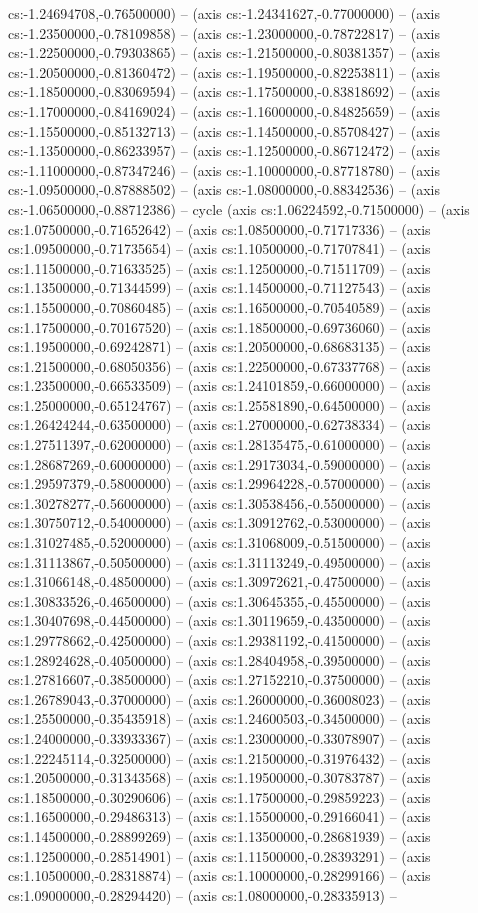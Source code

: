 cs:-1.24694708,-0.76500000) -- (axis cs:-1.24341627,-0.77000000) -- (axis cs:-1.23500000,-0.78109858) -- (axis cs:-1.23000000,-0.78722817) -- (axis cs:-1.22500000,-0.79303865) -- (axis cs:-1.21500000,-0.80381357) -- (axis cs:-1.20500000,-0.81360472) -- (axis cs:-1.19500000,-0.82253811) -- (axis cs:-1.18500000,-0.83069594) -- (axis cs:-1.17500000,-0.83818692) -- (axis cs:-1.17000000,-0.84169024) -- (axis cs:-1.16000000,-0.84825659) -- (axis cs:-1.15500000,-0.85132713) -- (axis cs:-1.14500000,-0.85708427) -- (axis cs:-1.13500000,-0.86233957) -- (axis cs:-1.12500000,-0.86712472) -- (axis cs:-1.11000000,-0.87347246) -- (axis cs:-1.10000000,-0.87718780) -- (axis cs:-1.09500000,-0.87888502) -- (axis cs:-1.08000000,-0.88342536) -- (axis cs:-1.06500000,-0.88712386) -- cycle (axis cs:1.06224592,-0.71500000) -- (axis cs:1.07500000,-0.71652642) -- (axis cs:1.08500000,-0.71717336) -- (axis cs:1.09500000,-0.71735654) -- (axis cs:1.10500000,-0.71707841) -- (axis cs:1.11500000,-0.71633525) -- (axis cs:1.12500000,-0.71511709) -- (axis cs:1.13500000,-0.71344599) -- (axis cs:1.14500000,-0.71127543) -- (axis cs:1.15500000,-0.70860485) -- (axis cs:1.16500000,-0.70540589) -- (axis cs:1.17500000,-0.70167520) -- (axis cs:1.18500000,-0.69736060) -- (axis cs:1.19500000,-0.69242871) -- (axis cs:1.20500000,-0.68683135) -- (axis cs:1.21500000,-0.68050356) -- (axis cs:1.22500000,-0.67337768) -- (axis cs:1.23500000,-0.66533509) -- (axis cs:1.24101859,-0.66000000) -- (axis cs:1.25000000,-0.65124767) -- (axis cs:1.25581890,-0.64500000) -- (axis cs:1.26424244,-0.63500000) -- (axis cs:1.27000000,-0.62738334) -- (axis cs:1.27511397,-0.62000000) -- (axis cs:1.28135475,-0.61000000) -- (axis cs:1.28687269,-0.60000000) -- (axis cs:1.29173034,-0.59000000) -- (axis cs:1.29597379,-0.58000000) -- (axis cs:1.29964228,-0.57000000) -- (axis cs:1.30278277,-0.56000000) -- (axis cs:1.30538456,-0.55000000) -- (axis cs:1.30750712,-0.54000000) -- (axis cs:1.30912762,-0.53000000) -- (axis cs:1.31027485,-0.52000000) -- (axis cs:1.31068009,-0.51500000) -- (axis cs:1.31113867,-0.50500000) -- (axis cs:1.31113249,-0.49500000) -- (axis cs:1.31066148,-0.48500000) -- (axis cs:1.30972621,-0.47500000) -- (axis cs:1.30833526,-0.46500000) -- (axis cs:1.30645355,-0.45500000) -- (axis cs:1.30407698,-0.44500000) -- (axis cs:1.30119659,-0.43500000) -- (axis cs:1.29778662,-0.42500000) -- (axis cs:1.29381192,-0.41500000) -- (axis cs:1.28924628,-0.40500000) -- (axis cs:1.28404958,-0.39500000) -- (axis cs:1.27816607,-0.38500000) -- (axis cs:1.27152210,-0.37500000) -- (axis cs:1.26789043,-0.37000000) -- (axis cs:1.26000000,-0.36008023) -- (axis cs:1.25500000,-0.35435918) -- (axis cs:1.24600503,-0.34500000) -- (axis cs:1.24000000,-0.33933367) -- (axis cs:1.23000000,-0.33078907) -- (axis cs:1.22245114,-0.32500000) -- (axis cs:1.21500000,-0.31976432) -- (axis cs:1.20500000,-0.31343568) -- (axis cs:1.19500000,-0.30783787) -- (axis cs:1.18500000,-0.30290606) -- (axis cs:1.17500000,-0.29859223) -- (axis cs:1.16500000,-0.29486313) -- (axis cs:1.15500000,-0.29166041) -- (axis cs:1.14500000,-0.28899269) -- (axis cs:1.13500000,-0.28681939) -- (axis cs:1.12500000,-0.28514901) -- (axis cs:1.11500000,-0.28393291) -- (axis cs:1.10500000,-0.28318874) -- (axis cs:1.10000000,-0.28299166) -- (axis cs:1.09000000,-0.28294420) -- (axis cs:1.08000000,-0.28335913) -- 